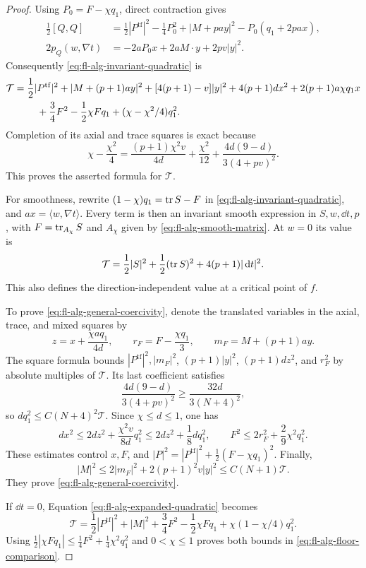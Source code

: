 \begin{proof}
Using \(P_0=F-\chi q_1\), direct contraction gives
\begin{align*}
 \frac12[Q,Q]
 &=\frac12|P^{\mathrm{tf}}|^2-\frac14P_0^2
   +|M+pa y|^2-P_0(q_1+2pa x),\\
 2p_Q(w,\nabla t)&=-2aP_0x+2aM\cdot y+2pv|y|^2.
\end{align*}
Consequently \eqref{eq:fl-alg-invariant-quadratic} is
\begin{align}
 \mathcal T={}&\frac12|P^{\mathrm{tf}}|^2
     +|M+(p+1)a y|^2+[4(p+1)-v]|y|^2
       +4(p+1)dx^2+2(p+1)a\chi q_1x \notag\\
 &\quad+\frac34F^2-\frac12\chi Fq_1
                +(\chi-\chi^2/4)q_1^2 .
 \label{eq:fl-alg-expanded-quadratic}
\end{align}
Completion of its axial and trace squares is exact because
\[
 \chi-\frac{\chi^2}{4}
 =\frac{(p+1)\chi^2v}{4d}+\frac{\chi^2}{12}
                  +\frac{4d(9-d)}{3(4+pv)^2}.
\]
This proves the asserted formula for \(\mathcal T\).

For smoothness, rewrite
\((1-\chi)q_1=\operatorname{tr} S-F\) in
\eqref{eq:fl-alg-invariant-quadratic}, and
\(ax=\langle w,\nabla t\rangle\).
Every term is then an invariant smooth expression in \(S,w,\dd t,p\),
with \(F=\operatorname{tr}_{A_\chi}S\) and \(A_\chi\) given by
\eqref{eq:fl-alg-smooth-matrix}.
At \(w=0\) its value is
\[
 \mathcal T=\frac12|S|^2+\frac12(\operatorname{tr} S)^2
                               +4(p+1)|\,\mathrm d t|^2.
\]
This also defines the direction-independent value at a critical point
of \(f\).

To prove \eqref{eq:fl-alg-general-coercivity}, denote the translated
variables in the axial, trace, and mixed squares by
\[
 z=x+\frac{\chi a q_1}{4d},\qquad
 r_F=F-\frac{\chi q_1}{3},\qquad
 m_F=M+(p+1)a y.
\]
The square formula bounds \(|P^{\mathrm{tf}}|^2,|m_F|^2\),
\((p+1)|y|^2\), \((p+1)dz^2\), and \(r_F^2\) by absolute multiples
of \(\mathcal T\). Its last coefficient satisfies
\[
 \frac{4d(9-d)}{3(4+pv)^2}
                    \ge \frac{32d}{3(N+4)^2},
\]
so \(dq_1^2\le C(N+4)^2\mathcal T\).
Since \(\chi\le d\le1\), one has
\[
 dx^2\le 2dz^2+\frac{\chi^2v}{8d}q_1^2
                    \le2dz^2+\frac18dq_1^2,
 \qquad
 F^2\le2r_F^2+\frac29\chi^2q_1^2.
\]
These estimates control \(x,F\), and
\(|P|^2=|P^{\mathrm{tf}}|^2+\frac12(F-\chi q_1)^2\).
Finally,
\[
 |M|^2\le2|m_F|^2+2(p+1)^2v|y|^2
                               \le C(N+1)\mathcal T.
\]
They prove \eqref{eq:fl-alg-general-coercivity}.

If \(\dd t=0\), Equation \eqref{eq:fl-alg-expanded-quadratic} becomes
\[
 \mathcal T=\frac12|P^{\mathrm{tf}}|^2+|M|^2
       +\frac34F^2-\frac12\chi Fq_1
                      +\chi(1-\chi/4)q_1^2.
\]
Using
\(\frac12|\chi Fq_1|\le\frac14F^2+\frac14\chi^2q_1^2\)
and \(0<\chi\le1\) proves both bounds in
\eqref{eq:fl-alg-floor-comparison}.
\end{proof}

